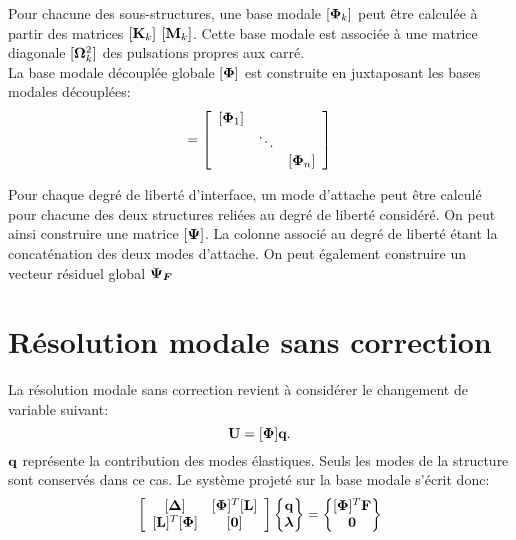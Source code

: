 \documentclass[10pt,a4paper,french]{report}
\begin{document}
Pour chacune des sous-structures, une base modale $[\boldsymbol{\Phi}_k]$ peut être calculée à partir des matrices $[\textbf{K}_k]$  $[\textbf{M}_k]$. Cette base modale est associée à une matrice diagonale $[\boldsymbol{\Omega}^2_k]$ des pulsations propres aux carré.\\

La base modale découplée globale $[\boldsymbol{\Phi}]$ est construite en juxtaposant les bases modales découplées: 
\begin{equation}[\bs{\Phi}]=\left[
	\begin{array}{cccccccc}
		{[\bs{\Phi}_1]}\\
	&\ddots \\
	&&{[\bs{\Phi}_n]}
		\end{array}\right]\end{equation}


Pour chaque degré de liberté d'interface, un mode d'attache peut être calculé pour chacune des deux structures reliées au degré de liberté considéré. On peut ainsi construire une matrice $[\boldsymbol{\Psi}]$. La colonne associé au degré de liberté étant la concaténation des deux modes d'attache. On peut également construire un vecteur résiduel global $\boldsymbol{\Psi_F}$


\section{Résolution modale sans correction}

La résolution modale sans correction revient à considérer le changement de variable suivant:
\begin{equation}
		\textbf{U}=[\boldsymbol{\Phi}]\textbf{q}.
\end{equation}
$\textbf{q}$ représente la contribution des modes élastiques. Seuls les modes de la structure sont conservés dans ce cas. Le système projeté sur la base modale s'écrit donc: 
\begin{equation}\label{eq:systeme modal decouple}
	\left[
	\begin{array}{cc}
		{[\boldsymbol{\Delta}]} & {[\boldsymbol{\Phi}]^T[\textbf{L}]}\\
		{[\textbf{L}]^T[\boldsymbol{\Phi}]}& {[\textbf{0}]}
	\end{array}
	\right]\begin{Bmatrix}
		\textbf{q}\\\boldsymbol{\lambda}
	\end{Bmatrix}=\begin{Bmatrix}
		[\boldsymbol{\Phi}]^T\textbf{F}\\
		\textbf{0}
	\end{Bmatrix}
\end{equation}
\end{document}
